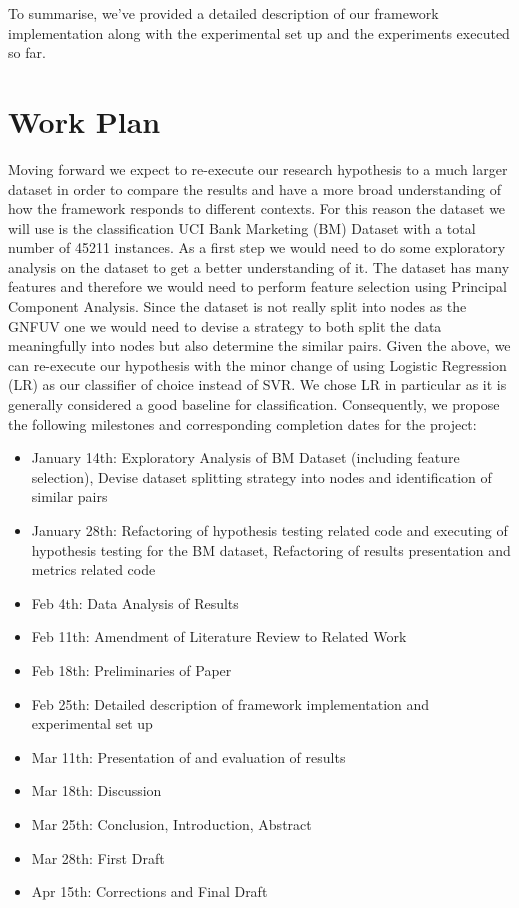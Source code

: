 \documentclass{mprop}
\begin{document}
To summarise, we've provided a detailed description of our framework implementation along with the experimental set up and the experiments executed so far.

\section{Work Plan}


Moving forward we expect to re-execute our research hypothesis to a much larger dataset in order to compare the results and have a more broad understanding of how the framework responds to different contexts. For this reason the dataset we will use is the classification UCI Bank Marketing (BM) Dataset with a total number of 45211 instances. As a first step we would need to do some exploratory analysis on the dataset to get a better understanding of it. The dataset has many features and therefore we would need to perform feature selection using Principal Component Analysis. Since the dataset is not really split into nodes as the GNFUV one we would need to devise a strategy to both split the data meaningfully into nodes but also determine the similar pairs. Given the above, we can re-execute our hypothesis with the minor change of using Logistic Regression (LR) as our classifier of choice instead of SVR.  We chose LR in particular as it is generally considered a good baseline for classification.
\newpage
Consequently, we propose the following milestones and corresponding completion dates for the project:

\begin{itemize}
    \item January 14th: Exploratory Analysis of BM Dataset (including feature selection), Devise dataset splitting strategy into nodes and identification of similar pairs 
    \item January 28th: Refactoring of hypothesis testing related code and executing of hypothesis testing for the BM dataset, Refactoring of results presentation and metrics related code
    \item Feb 4th: Data Analysis of Results
    \item Feb 11th: Amendment of Literature Review to Related Work
    \item Feb 18th: Preliminaries of Paper
    \item Feb 25th: Detailed description of framework implementation and experimental set up 
    \item Mar 11th: Presentation of and evaluation of results
    \item Mar 18th: Discussion
    \item Mar 25th: Conclusion, Introduction, Abstract
    \item Mar 28th: First Draft
    \item Apr 15th: Corrections and Final Draft
\end{itemize}



\end{document}
